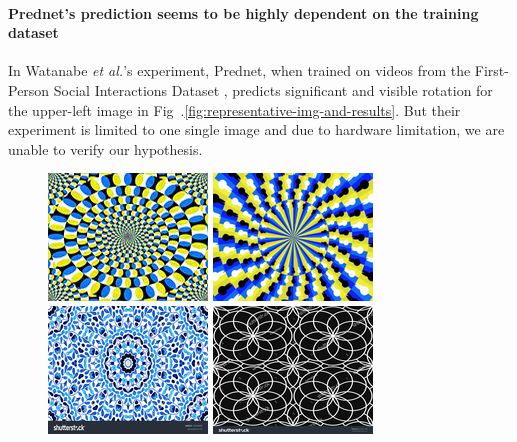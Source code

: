 \documentclass[journal]{IEEEtran}
\begin{document}
\paragraph{Prednet's prediction seems to be highly dependent on the training dataset} In Watanabe \textit{et al.}'s experiment, Prednet, when trained on videos from the First-Person
Social Interactions Dataset \cite{fathi2012social}, predicts significant and visible rotation for the upper-left image in Fig~.\ref{fig:representative-img-and-results}. But their experiment is limited to one single image and due to hardware limitation, we are unable to verify our hypothesis.

\begin{figure}
  \centering
  \includegraphics[width=0.24\linewidth]{fig/rotate-0.png}
  \includegraphics[width=0.24\linewidth]{fig/rotate-1.png}
  \includegraphics[width=0.24\linewidth]{fig/control-0.png}
  \includegraphics[width=0.24\linewidth]{fig/control-1.png}


\end{figure}
\end{document}
